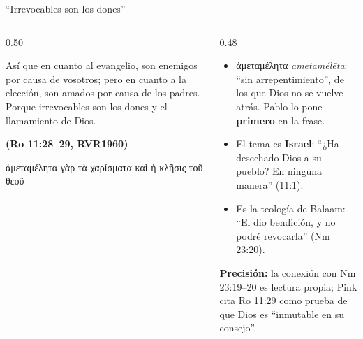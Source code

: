 \documentclass[hyperref={bookmarks=false},aspectratio=169]{beamer}
\newcommand{\grc}[1]{\foreignlanguage{ancientgreek}{#1}}
\newcommand{\fuente}[1]{\par\hfill{\upshape\bfseries\footnotesize\textcolor{azul}{#1}}}
\newcommand{\destacar}[1]{\textbf{\textcolor{azul}{#1}}}
\newcommand{\precision}[1]{{\footnotesize\color{gris}\textbf{Precisión:} #1}}
\begin{document}
\begin{frame}{``Irrevocables son los dones''}
\begin{columns}[t,onlytextwidth]
\begin{column}{0.50\textwidth}
\begin{cita}Así que en cuanto al evangelio, son enemigos por causa de vosotros; pero en cuanto a la elección, son amados por causa de los padres. Porque irrevocables son los dones y el llamamiento de Dios.\fuente{(Ro 11:28--29, RVR1960)}\end{cita}
\begin{center}\grc{ἀμεταμέλητα γὰρ τὰ χαρίσματα καὶ ἡ κλῆσις τοῦ θεοῦ}\end{center}
\end{column}
\begin{column}{0.48\textwidth}\small
\begin{itemize}
\item \grc{ἀμεταμέλητα} \emph{ametamélēta}: ``sin arrepentimiento'', de los que Dios no se vuelve atrás. Pablo lo pone \destacar{primero} en la frase.
\item El tema es \destacar{Israel}: ``¿Ha desechado Dios a su pueblo? En ninguna manera'' (11:1).
\item Es la teología de Balaam: ``El dio bendición, y no podré revocarla'' (Nm 23:20).
\end{itemize}
\precision{la conexión con Nm 23:19--20 es lectura propia; Pink cita Ro 11:29 como prueba de que Dios es ``inmutable en su consejo''.}
\end{column}
\end{columns}
\end{frame}
\end{document}
